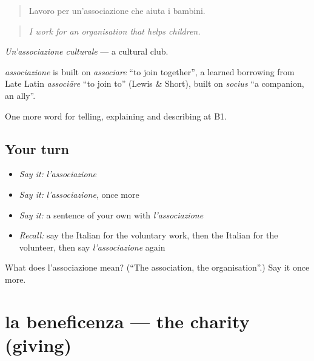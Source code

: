 \begin{quote}
Lavoro per un'associazione che aiuta i bambini.
\end{quote}

\begin{quote}
\emph{I work for an organisation that helps children.}
\end{quote}

\emph{Un'associazione culturale} — a cultural club.

\begin{cousinweb}
\emph{associazione} is built on \emph{associare} \textquotedblleft{}to join together\textquotedblright{}, a learned borrowing from Late Latin \emph{associāre} \textquotedblleft{}to join to\textquotedblright{} (Lewis \& Short), built on \emph{socius} \textquotedblleft{}a companion, an ally\textquotedblright{}.
\end{cousinweb}

\begin{grammarlens}[title={What you've built}]
One more word for telling, explaining and describing at B1.
\end{grammarlens}

\subsection*{Your turn}
\begin{itemize}
\raggedright
  \item \emph{Say it:} \emph{l'associazione}
  \item \emph{Say it:} \emph{l'associazione}, once more
  \item \emph{Say it:} a sentence of your own with \emph{l'associazione}
  \item \emph{Recall:} say the Italian for the voluntary work, then the Italian for the volunteer, then say \emph{l'associazione} again
\end{itemize}

\begin{tcolorbox}[breakable,colback=teal!4,colframe=teal!35!black,title={Before you move on}]
What does l'associazione mean? (\textquotedblleft{}The association, the organisation\textquotedblright{}.) Say it once more.
\end{tcolorbox}
\section[la beneficenza]{la beneficenza — the charity (giving)}

